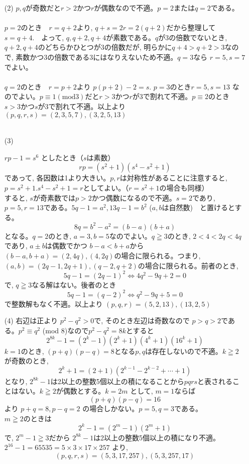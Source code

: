 \documentclass[twocolumn]{jsarticle}
\newcommand{\dou}{\Leftrightarrow}  %
\renewcommand{\geq}{\geqq}
\begin{document}
\begin{enumerate}
\item[(2)] $p,q$が奇数だと$r>2$かつ$r$が偶数なので不適。$p=2$または$q=2$である。\\
\\
$p=2$のとき　$r=q+2$より, $q+s=2r=2(q+2)$だから整理して $s=q+4$.　よって, $q,q+2,q+4$が素数である。$q$が3の倍数でないとき, $q+2, q+4$のどちらかひとつが3の倍数だが, 明らかに$q+4>q+2>3$なので, 素数かつ3の倍数である3にはなりえないため不適。$q=3$なら $r=5, s=7$でよい。\\
\\
$q=2$のとき　$r=p+2$より $p(p+2)-2=s$. $p=3$のとき$r=5, s=13$ なのでよい。$p\equiv 1 　(\mbox{mod} 3)$だと$r>3$かつ$r$が3で割れて不適。$p\equiv 2$のとき$s>3$かつ$s$が3で割れて不適。以上より $(p,q,r,s)=(2,3,5,7), (3,2,5,13)$\\
\\
\item[(3)] 

$rp-1=s^6$ としたとき（$s$は素数）
\[rp=(s^2+1)(s^4-s^2+1)\]
であって, 各因数は1より大きい。$p,r$は対称性があることに注意すると, $p=s^2+1. s^4-s^2+1=r$としてよい。（$r=s^2+1$の場合も同様）\\
すると, $s$が奇素数では$p>2$かつ偶数になるので不適。$s=2$であり, $p=5, r=13$である。$5q-1=a^2, 13q-1=b^2$ ($a,b$は自然数)　と置けるとする。
\[8q=b^2-a^2=(b-a)(b+a)\]
となる。$q=2$のとき, $a=3, b=5$なのでよい。$q\geq 3$のとき, $2<4<2q<4q$であり, $a\pm b$は偶数でかつ $b-a<b+a$から $(b-a,b+a)=(2, 4q), (4,2q)$の場合に限られる。つまり, $(a,b)=(2q-1, 2q+1), (q-2, q+2)$の場合に限られる。前者のとき,
\[5q-1=(2q-1)^2 \dou 4q^2-9q+2=0\]
で, $q\geq 3$なる解はない。後者のとき
\[5q-1=(q-2)^2 \dou q^2-9q+5=0\]
で整数解もなく不適。以上より $(p,q,r)=(5,2,13), (13,2,5)$
\item[(4)] 右辺は正より $p^2-q^2>0$で, そのとき左辺は奇数なので $p>q>2$である。$p^2\equiv q^2$ (mod $8$)なので$p^2-q^2=8k$とすると
\[2^{8k}-1=(2^k-1)(2^k+1)(4^k+1)(16^k+1)\]
$k=1$のとき, $(p+q)(p-q)=8$となる$p,q$は存在しないので不適。$k\geq 2$が奇数のとき, 
\[2^k+1=(2+1)(2^{k-1}-2^{k-2}+\cdots +1)\]
となり, $2^{8k}-1$は2以上の整数5個以上の積になることから$pqrs$と表されることはない。$k\geq 2$が偶数とする。$k=2m$ として, $m=1$ならば 
\[(p+q)(p-q)=16\]
より $p+q=8, p-q=2$ の場合しかない。$p=5, q=3$である。\\
$m\geq 2$のときは
\[2^{k}-1=(2^m-1)(2^m+1)\]
で, $2^{m}-1\geq 3$だから $2^{8k}-1$は2以上の整数5個以上の積になり不適。\\
$2^{16}-1=65535=5\times 3\times 17\times 257$ より,
\[(p,q,r,s)=(5,3,17,257), (5,3,257,17)\]



\end{enumerate}
\end{document}
